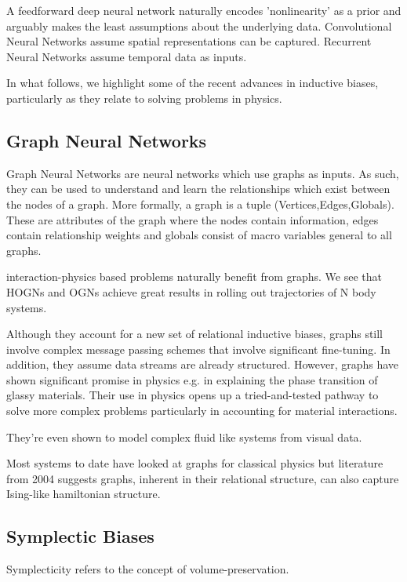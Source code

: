 \documentclass{article}
\begin{document}
A feedforward deep neural network naturally encodes 'nonlinearity' as a prior and arguably makes the least assumptions about the underlying data. Convolutional Neural Networks assume spatial representations can be captured. Recurrent Neural Networks assume temporal data as inputs. 

In what follows, we highlight some of the recent advances in inductive biases, particularly as they relate to solving problems in physics.

\subsection{Graph Neural Networks}

Graph Neural Networks are neural networks which use graphs as inputs. As such, they can be used to understand and learn the relationships which exist between the nodes of a graph. More formally, a graph is a tuple (Vertices,Edges,Globals). These are attributes of the graph where the nodes contain information, edges contain relationship weights and globals consist of macro variables general to all graphs. 

interaction-physics based problems naturally benefit from graphs. We see that HOGNs and OGNs achieve great results in rolling out trajectories of N body systems. 

Although they account for a new set of relational inductive biases, graphs still involve complex message passing schemes that involve significant fine-tuning. In addition, they assume data streams are already structured. However, graphs have shown significant promise in physics e.g. in explaining the phase transition of glassy materials. Their use in physics opens up a tried-and-tested pathway to solve more complex problems particularly in accounting for material interactions. 

They're even shown to model complex fluid like systems from visual data. 

Most systems to date have looked at graphs for classical physics but literature from 2004 suggests graphs, inherent in their relational structure, can also capture Ising-like hamiltonian structure.


\subsection{Symplectic Biases}

Symplecticity refers to the concept of volume-preservation. 
\end{document}
